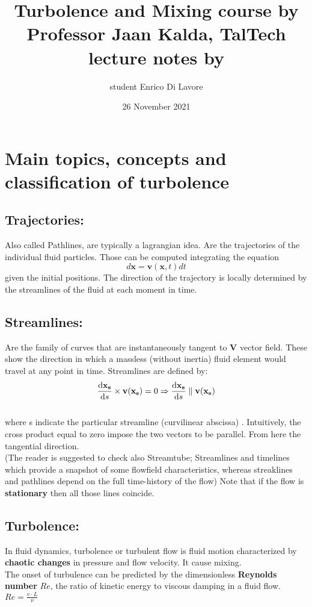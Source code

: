 \documentclass[a4paper,11pt]{article}
\begin{document}
\title{%
Turbolence and Mixing course by\\
Professor Jaan Kalda, TalTech\\
lecture notes by}
\author{student Enrico Di Lavore}
\date{26 November 2021}
\maketitle


	\section{Main topics, concepts and classification of turbolence}
	
\subsection {Trajectories:}
Also called Pathlines, are typically a lagrangian idea. Are the trajectories of the individual fluid particles. 
Those can be computed integrating the equation
\[ d\mathbf{x}=\mathbf{v}(\mathbf{x},t) dt   \]
given the initial positions.
The direction of the trajectory is locally determined by the streamlines of the fluid at each moment in time.

\subsection{Streamlines:}
Are the family of curves that are instantaneously tangent to $\mathbf{V}$ vector field. These show the direction in which a massless (without inertia) fluid element would travel at any point in time.
Streamlines are defined by:
\[ \dv{\mathbf{x_s}}{s}  \times \mathbf{v}(\mathbf{x_s})=0  \Rightarrow \dv{\mathbf{x_s}}{s}\parallel  \mathbf{v}(\mathbf{x_s})   \] \\
where s indicate the particular streamline (curvilinear abscissa) . Intuitively, the cross product equal to zero impose the two vectors to be parallel. From here the tangential direction.\\
(The reader is suggested to check also Streamtube; Streamlines and timelines which provide a snapshot of some flowfield characteristics, whereas streaklines and pathlines depend on the full time-history of the flow)
Note that if the flow is \textbf{stationary} then all those lines coincide. %

\subsection {Turbolence:} 
In fluid dynamics, turbolence or turbulent flow is fluid motion characterized by \textbf{chaotic changes} in pressure and flow velocity. It cause mixing.\\
The onset of turbulence can be predicted by the dimensionless \textbf{Reynolds number} $Re$, the ratio of kinetic energy to viscous damping in a fluid flow. $Re=\frac{v \cdot L}{\nu}$
\end{document}
